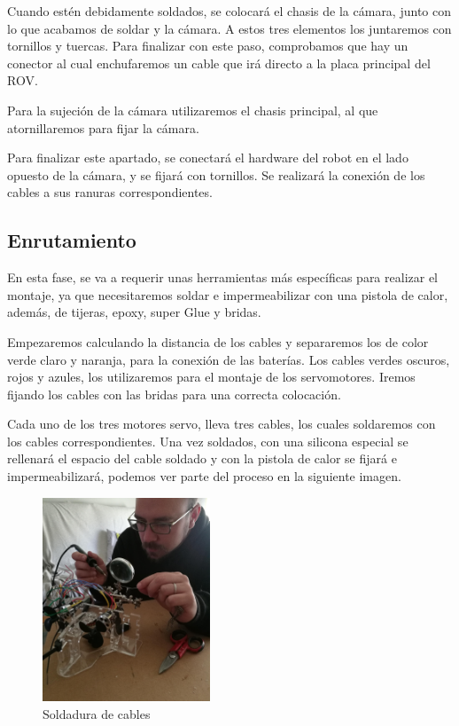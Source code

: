 Cuando estén debidamente soldados, se colocará el chasis de la cámara, junto con lo que acabamos de soldar y la cámara. A estos tres elementos los juntaremos con tornillos y tuercas. Para finalizar con este paso, comprobamos que hay un conector al cual enchufaremos un cable que irá directo a la placa principal del ROV.

Para la sujeción de la cámara utilizaremos el chasis principal, al que atornillaremos para fijar la cámara. 

Para finalizar este apartado, se conectará el hardware del robot en el lado opuesto de la cámara, y se fijará con tornillos. Se realizará la conexión de los cables a sus ranuras correspondientes.

\subsection{Enrutamiento}
\label{subsec:enrutamiento}

En esta fase, se va a requerir unas herramientas más específicas para realizar el montaje, ya que necesitaremos soldar e impermeabilizar con una pistola de calor, además, de tijeras, epoxy, super Glue y bridas.

Empezaremos calculando la distancia de los cables y separaremos los de color verde claro y naranja, para la conexión de las baterías. Los cables verdes oscuros, rojos y azules, los utilizaremos para el montaje de los servomotores. Iremos fijando los cables con las bridas para una correcta colocación.

Cada uno de los tres motores servo, lleva tres cables, los cuales soldaremos con los cables correspondientes. Una vez soldados, con una silicona especial se rellenará el espacio del cable soldado y con la pistola de calor se fijará e impermeabilizará, podemos ver parte del proceso en la siguiente imagen.


\begin{figure} [hbtp]
  \begin{center}
    \includegraphics[width=5cm]{img/cap3/3_3/soldar}
  \end{center}
  \caption{Soldadura de cables}
  \label{fig:soldar}
\end{figure}

